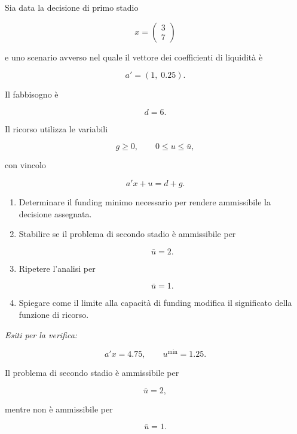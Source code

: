 \begin{exercise}

\label{ex:cap14-proposto-limite-funding}

Sia data la decisione di primo stadio

\[
x=
\begin{pmatrix}
3\\
7
\end{pmatrix}
\]

\noindent e uno scenario avverso nel quale il vettore dei coefficienti di liquidit\`a
\`e

\[
a'
=
(1,\;0.25).
\]

Il fabbisogno \`e

\[
d=6.
\]

Il ricorso utilizza le variabili

\[
g\geq0,
\qquad
0\leq u\leq\bar u,
\]

\noindent con vincolo

\[
a'x+u
=
d+g.
\]

\begin{enumerate}

\item Determinare il funding minimo necessario per rendere ammissibile la
decisione assegnata.

\item Stabilire se il problema di secondo stadio \`e ammissibile per

\[
\bar u=2.
\]

\item Ripetere l'analisi per

\[
\bar u=1.
\]

\item Spiegare come il limite alla capacit\`a di funding modifica il
significato della funzione di ricorso.

\end{enumerate}

\medskip

\noindent
\textit{Esiti per la verifica:}

\[
a'x=4.75,
\qquad
u^{\min}=1.25.
\]

Il problema di secondo stadio \`e ammissibile per

\[
\bar u=2,
\]

\noindent mentre non \`e ammissibile per

\[
\bar u=1.
\]

\end{exercise}


